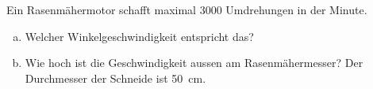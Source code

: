 
\begin{aufgabe}
	Ein Rasenmähermotor schafft maximal 3000 Umdrehungen in der Minute.
	\begin{enumerate} [a)]
		\item Welcher Winkelgeschwindigkeit entspricht das?
		\item Wie hoch ist die Geschwindigkeit aussen am Rasenmähermesser? Der Durchmesser der Schneide ist \SI{50}{cm}.
	\end{enumerate}
\end{aufgabe}

